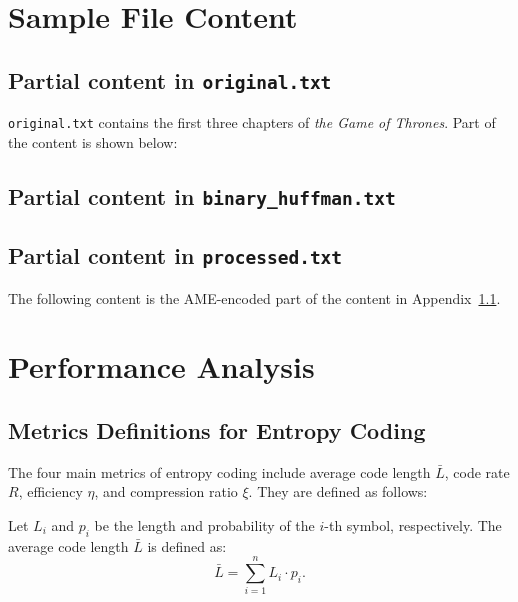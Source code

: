 \documentclass[12pt,twoside]{article}
\begin{document}
\begin{appendices}
\newpage
\section{Sample File Content}
\subsection{Partial content in \texttt{original.txt}}
\label{lst:originalpart}

\texttt{original.txt} contains the first three chapters of \textit{the Game of Thrones}. Part of the content is shown below:


\subsection{Partial content in \texttt{binary\_huffman.txt}}
\label{lst:binaryhuffmanpart}


\subsection{Partial content in \texttt{processed.txt}}
\label{lst:processedpart}

The following content is the AME-encoded part of the content in Appendix~\ref{lst:originalpart}.


\newpage
\section{Performance Analysis}
\subsection{Metrics Definitions for Entropy Coding}
\label{app:metrics}

The four main metrics of entropy coding include average code length $\bar{L}$, code rate $R$, efficiency $\eta$, and compression ratio $\xi$. They are defined as follows:

Let $L_i$ and $p_i$ be the length and probability of the $i$-th symbol, respectively. The average code length $\bar{L}$ is defined as:
\begin{equation}
    \bar{L} = \sum_{i=1}^{n} L_i \cdot p_i.
\end{equation}


\end{appendices}
\end{document}
